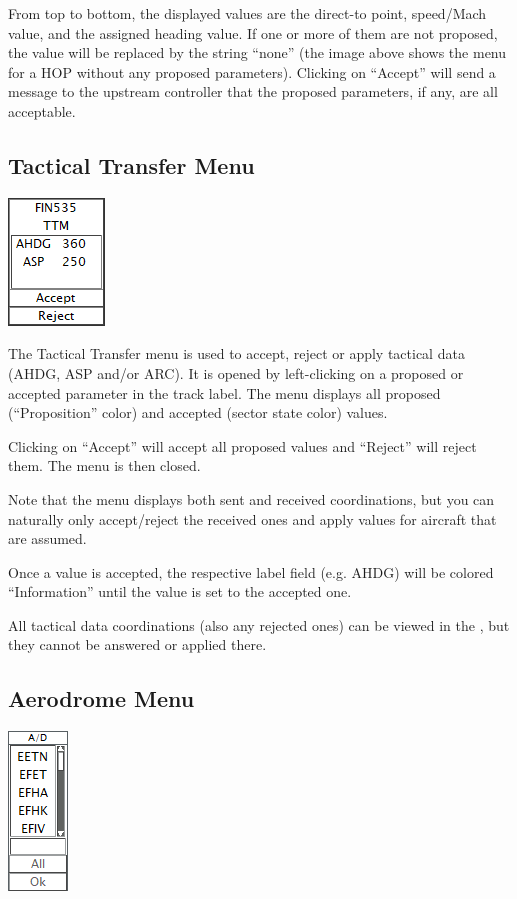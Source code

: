 \documentclass[11pt,a4paper,oldfontcommands]{memoir}
\begin{document}
From top to bottom, the displayed values are the direct-to point, speed/Mach value, and the assigned heading value. If one or more of them are not proposed, the value will be replaced by the string “none” (the image above shows the menu for a HOP without any proposed parameters). Clicking on “Accept” will send a message to the upstream controller that the proposed parameters, if any, are all acceptable.

\subsection{Tactical Transfer Menu}
\label{menu:ttm}
\includegraphics{img/ttm.png}

The Tactical Transfer menu is used to accept, reject or apply tactical data (AHDG, ASP and/or ARC). It is opened by left-clicking on a proposed or accepted parameter in the track label. The menu displays all proposed (“Proposition” color) and accepted (sector state color) values.

Clicking on “Accept” will accept all proposed values and “Reject” will reject them. The menu is then closed.

Note that the menu displays both sent and received coordinations, but you can naturally only accept/reject the received ones and apply values for aircraft that are assumed.

Once a value is accepted, the respective label field (e.g. AHDG) will be colored “Information” until the value is set to the accepted one.

All tactical data coordinations (also any rejected ones) can be viewed in the \textit{}, but they cannot be answered or applied there.

\subsection{Aerodrome Menu}
\label{menu:ad}
\includegraphics{img/ad.png}
\end{document}
